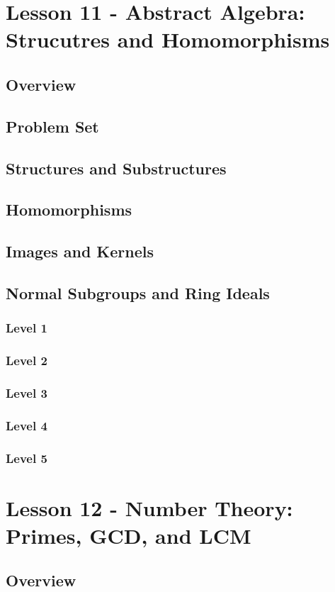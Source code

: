 \documentclass{article}
\begin{document}
\section{Lesson 11 - Abstract Algebra: Strucutres and Homomorphisms}
\subsection{Overview}
\subsection{Problem Set}
\subsection{Structures and Substructures}
\subsection{Homomorphisms}
\subsection{Images and Kernels}
\subsection{Normal Subgroups and Ring Ideals}
\subsubsection{Level 1}
\subsubsection{Level 2}
\subsubsection{Level 3}
\subsubsection{Level 4}
\subsubsection{Level 5}
\pagebreak

\section{Lesson 12 - Number Theory: Primes, GCD, and LCM}
\subsection{Overview}
\end{document}

